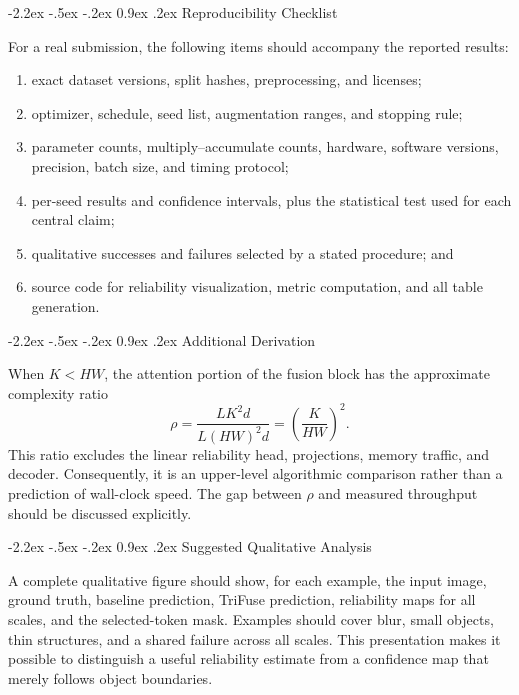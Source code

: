 \documentclass[10pt,twocolumn,letterpaper]{article}
\makeatletter
\newcommand{\method}{TriFuse}
\renewcommand\section{\@startsection{section}{1}{\z@}%
  {-2.2ex \@plus -.5ex \@minus -.2ex}%
  {0.9ex \@plus .2ex}%
  {\normalfont\large\bfseries\color{iccvblue}}}
\makeatother
\begin{document}
\clearpage
\appendix
\section{Reproducibility Checklist}
\label{sec:appendix}

For a real submission, the following items should accompany the reported
results:
\begin{enumerate}
  \item exact dataset versions, split hashes, preprocessing, and licenses;
  \item optimizer, schedule, seed list, augmentation ranges, and stopping rule;
  \item parameter counts, multiply--accumulate counts, hardware, software
        versions, precision, batch size, and timing protocol;
  \item per-seed results and confidence intervals, plus the statistical test
        used for each central claim;
  \item qualitative successes and failures selected by a stated procedure; and
  \item source code for reliability visualization, metric computation, and all
        table generation.
\end{enumerate}

\section{Additional Derivation}

When $K<HW$, the attention portion of the fusion block has the approximate
complexity ratio
\begin{equation}
  \rho = \frac{LK^2d}{L(HW)^2d}=\left(\frac{K}{HW}\right)^2.
\end{equation}
This ratio excludes the linear reliability head, projections, memory traffic,
and decoder. Consequently, it is an upper-level algorithmic comparison rather
than a prediction of wall-clock speed. The gap between $\rho$ and measured
throughput should be discussed explicitly.

\section{Suggested Qualitative Analysis}

A complete qualitative figure should show, for each example, the input image,
ground truth, baseline prediction, \method{} prediction, reliability maps for all
scales, and the selected-token mask. Examples should cover blur, small objects,
thin structures, and a shared failure across all scales. This presentation makes
it possible to distinguish a useful reliability estimate from a confidence map
that merely follows object boundaries.
\end{document}
